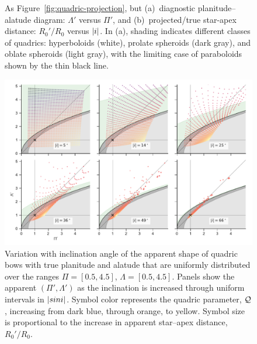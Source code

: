 \begin{figure}
\begin{tabular}{@{}ll@{}}
  \end{tabular}
  \caption[]{ As Figure~\ref{fig:quadric-projection}, but %
    (a)~diagnostic planitude--alatude diagram: \(\Lambda'\) versus
    \(\Pi'\), and %
    (b)~projected/true star-apex distance: \(R_0' / R_0\) versus
    \(\lvert i\rvert\). %
    In (a), shading indicates different classes of quadrics:
    hyperboloids (white), prolate spheroids (dark gray), and oblate
    spheroids (light gray), with the limiting case of paraboloids
    shown by the thin black line.}
  \label{fig:quadric-projection-continued}
\end{figure}

\begin{figure}
  \centering
  \includegraphics[width=\linewidth]{figs/projected-R90-Rc-snapshots}
  \caption[]{Variation with inclination angle of the apparent shape of
    quadric bows with true planitude and alatude that are uniformly
    distributed over the ranges \(\Pi = [0.5, 4.5]\),
    \(\Lambda = [0.5, 4.5]\).  Panels show the apparent
    \((\Pi', \Lambda')\) as the inclination is increased through uniform
    intervals in \(\lvert sin i\rvert\).  Symbol color represents the quadric
    parameter, \(\mathcal{Q}\), increasing from dark blue, through orange, to
    yellow. Symbol size is proportional to the increase in apparent
    star--apex distance, \(R_0'/R_0\).}
  \label{fig:projected-R90-Rc-snapshots}
\end{figure}

